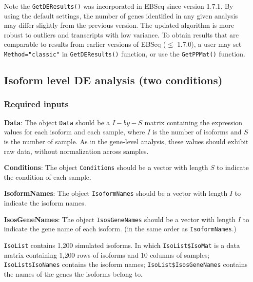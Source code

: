 \documentclass{article}
\begin{document}
\noindent Note the \verb+GetDEResults()+ was incorporated in EBSeq since version 1.7.1. 
By using the default settings, the number of genes identified in any given analysis may 
differ slightly from the previous version. The updated algorithm is more robust to outliers
and transcripts with low variance. To obtain results that are comparable
to results from earlier versions of EBSeq ($\le$ 1.7.0), a user may set
\verb+Method="classic"+ in \verb+GetDEResults()+ function, or use the \verb+GetPPMat()+ function.


\subsection{Isoform level DE analysis (two conditions)}
\label{sec:startisode}
\subsubsection{Required inputs}
\label{sec:startisodeinput}

\begin{flushleft}
{\bf Data}:   The object \verb+Data+ should be a $I-by-S$ matrix containing the expression values for each isoform and each sample,
where $I$ is the number of isoforms and $S$ is the number of sample. As in the gene-level analysis, these values should exhibit raw data, without normalization
across samples.

\vspace{5 mm}

{\bf Conditions}:  The object \verb+Conditions+ should be a vector with length $S$ to indicate the condition of each sample.

\vspace{5 mm}

{\bf IsoformNames}:   The object \verb+IsoformNames+ should be a vector with length $I$ to indicate the isoform names.

\vspace{5 mm}

{\bf IsosGeneNames}:  The object \verb+IsosGeneNames+ should be a vector with length $I$ to indicate the gene name of each isoform. 
(in the same order as \verb+IsoformNames+.)
\end{flushleft}

\noindent \verb+IsoList+ contains 1,200 simulated isoforms. 
In which \verb+IsoList$IsoMat+ is a data matrix containing
1,200 rows of isoforms and 10 columns of samples; 
\verb+IsoList$IsoNames+ contains the isoform names; 
\verb+IsoList$IsosGeneNames+ contains the names of the genes the isoforms belong to.
\end{document}
